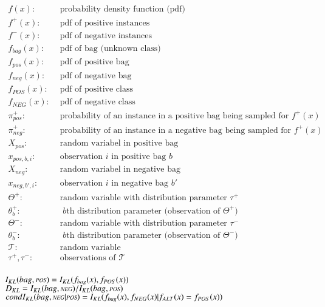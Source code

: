 \begin{align*}
  f(x) : & \text{ probability density function (pdf)} \\
  f^+(x) : & \text{ pdf of positive instances} \\
  f^-(x) : & \text{ pdf of negative instances} \\
  f_{bag}(x) : & \text{ pdf of bag (unknown class)} \\
  f_{pos}(x) : & \text{ pdf of positive bag} \\
  f_{neg}(x) : & \text{ pdf of negative bag} \\
  f_{POS} (x) : & \text{ pdf of positive class} \\
  f_{NEG} (x) : & \text{ pdf of negative class} \\
  \pi_{pos}^+ : & \text{ probability of an instance in a positive bag being sampled for } f^+(x)\\
  \pi_{neg}^+ : & \text{ probability of an instance in a negative bag being sampled for } f^+(x) \\
  X_{pos} : & \text{ random variabel in positive bag} \\
  x_{pos,b,i} : & \text{ observation $i$ in positive bag $b$} \\
  X_{neg} : & \text{ random variabel in negative bag} \\
  x_{neg,{b'},i} : & \text{ observation $i$ in negative bag $b'$} \\
  \Theta^+ : & \text{ random variable with distribution parameter } \tau^+ \\
  \theta_b^+ : & \text{ $b$th distribution parameter (observation of $\Theta^+$)} \\
  \Theta^- : & \text{ random variable with distribution parameter $\tau^-$} \\
  \theta_b^- : & \text{ $b$th distribution parameter (observation of $\Theta^-$)} \\
  \mathcal{T} : & \text{ random variable} \\
  \tau^+, \tau^- : & \text{ observations of $\mathcal{T}$} \\
\end{align*}

\noindent
$I_{KL}(bag,\text{\scriptsize{{\it POS}}}) = I_{KL}(f_{bag}(x), f_{POS}(x))$ \\
$D_{KL} = I_{KL} (bag,\text{\scriptsize{{\it NEG}}})/I_{KL} (bag,\text{\scriptsize{{\it POS}}}) $\\
$condI_{KL} (bag,\text{\scriptsize{{\it NEG}}}|\text{\scriptsize{{\it POS}}}) = I_{KL} (f_{bag}(x),f_{NEG}(x) | f_{ALT}(x) = f_{POS} (x)) $ \\

 